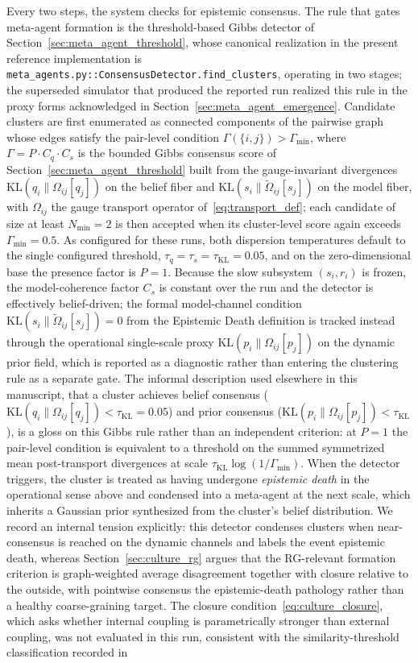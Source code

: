 \documentclass[11pt]{article}
\begin{document}
Every two steps, the system checks for epistemic consensus. The rule that gates meta-agent formation is the threshold-based Gibbs detector of Section~\ref{sec:meta_agent_threshold}, whose canonical realization in the present reference implementation is \texttt{meta\_agents.py::ConsensusDetector.find\_clusters}, operating in two stages; the superseded simulator that produced the reported run realized this rule in the proxy forms acknowledged in Section~\ref{sec:meta_agent_emergence}. Candidate clusters are first enumerated as connected components of the pairwise graph whose edges satisfy the pair-level condition $\Gamma(\{i,j\}) > \Gamma_{\min}$, where $\Gamma = P \cdot C_q \cdot C_s$ is the bounded Gibbs consensus score of Section~\ref{sec:meta_agent_threshold} built from the gauge-invariant divergences $\mathrm{KL}(q_i \| \Omega_{ij}[q_j])$ on the belief fiber and $\mathrm{KL}(s_i \| \tilde{\Omega}_{ij}[s_j])$ on the model fiber, with $\Omega_{ij}$ the gauge transport operator of~\eqref{eq:transport_def}; each candidate of size at least $N_{\min} = 2$ is then accepted when its cluster-level score again exceeds $\Gamma_{\min} = 0.5$. As configured for these runs, both dispersion temperatures default to the single configured threshold, $\tau_q = \tau_s = \tau_{\mathrm{KL}} = 0.05$, and on the zero-dimensional base the presence factor is $P = 1$. Because the slow subsystem $(s_i, r_i)$ is frozen, the model-coherence factor $C_s$ is constant over the run and the detector is effectively belief-driven; the formal model-channel condition $\mathrm{KL}(s_i \| \tilde{\Omega}_{ij}[s_j]) = 0$ from the Epistemic Death definition is tracked instead through the operational single-scale proxy $\mathrm{KL}(p_i \| \Omega_{ij}[p_j])$ on the dynamic prior field, which is reported as a diagnostic rather than entering the clustering rule as a separate gate. The informal description used elsewhere in this manuscript, that a cluster achieves belief consensus ($\mathrm{KL}(q_i \| \Omega_{ij}[q_j]) < \tau_{\mathrm{KL}} = 0.05$) and prior consensus ($\mathrm{KL}(p_i \| \Omega_{ij}[p_j]) < \tau_{\mathrm{KL}}$), is a gloss on this Gibbs rule rather than an independent criterion: at $P = 1$ the pair-level condition is equivalent to a threshold on the summed symmetrized mean post-transport divergences at scale $\tau_{\mathrm{KL}}\log(1/\Gamma_{\min})$. When the detector triggers, the cluster is treated as having undergone \emph{epistemic death} in the operational sense above and condensed into a meta-agent at the next scale, which inherits a Gaussian prior synthesized from the cluster's belief distribution. We record an internal tension explicitly: this detector condenses clusters when near-consensus is reached on the dynamic channels and labels the event epistemic death, whereas Section~\ref{sec:culture_rg} argues that the RG-relevant formation criterion is graph-weighted average disagreement together with closure relative to the outside, with pointwise consensus the epistemic-death pathology rather than a healthy coarse-graining target. The closure condition~\eqref{eq:culture_closure}, which asks whether internal coupling is parametrically stronger than external coupling, was not evaluated in this run, consistent with the similarity-threshold classification recorded in 
\end{document}
